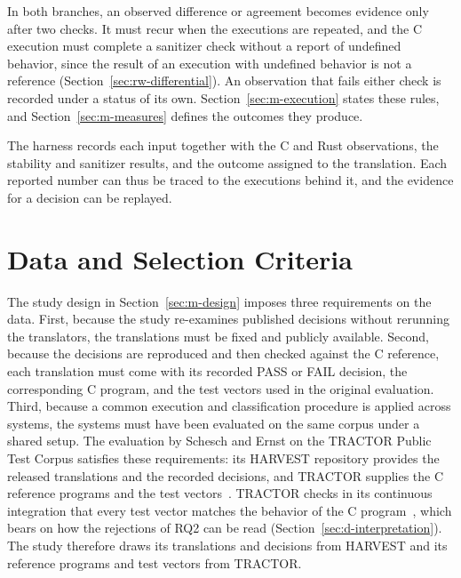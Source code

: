 In both branches, an observed difference or agreement becomes evidence only after two checks. It must recur when the executions are repeated, and the C execution must complete a sanitizer check without a report of undefined behavior, since the result of an execution with undefined behavior is not a reference (Section~\ref{sec:rw-differential}). An observation that fails either check is recorded under a status of its own. Section~\ref{sec:m-execution} states these rules, and Section~\ref{sec:m-measures} defines the outcomes they produce.

\enlargethispage{1\baselineskip}The harness records each input together with the C and Rust observations, the stability and sanitizer results, and the outcome assigned to the translation. Each reported number can thus be traced to the executions behind it, and the evidence for a decision can be replayed.

\section{Data and Selection Criteria}\label{sec:m-data}

The study design in Section~\ref{sec:m-design} imposes three requirements on the data. First, because the study re-examines published decisions without rerunning the translators, the translations must be fixed and publicly available. Second, because the decisions are reproduced and then checked against the C reference, each translation must come with its recorded PASS or FAIL decision, the corresponding C program, and the test vectors used in the original evaluation. Third, because a common execution and classification procedure is applied across systems, the systems must have been evaluated on the same corpus under a shared setup. The evaluation by Schesch and Ernst on the TRACTOR Public Test Corpus satisfies these requirements: its HARVEST repository provides the released translations and the recorded decisions, and TRACTOR supplies the C reference programs and the test vectors~\cite{schesch2026actor,harvest-results,tractor-test-corpus}. TRACTOR checks in its continuous integration that every test vector matches the behavior of the C program~\cite{okhravi2026tractorbenchmark}, which bears on how the rejections of RQ2 can be read (Section~\ref{sec:d-interpretation}). The study therefore draws its translations and decisions from HARVEST and its reference programs and test vectors from TRACTOR.

